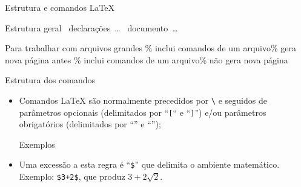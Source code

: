 \begin{frame}{Estrutura e comandos \LaTeX}
	\begin{Codigo}{Estrutura geral}
		\n
			~declarações~\dots\n
		\n
			~documento~\dots\n
	\end{Codigo}

\medskip

	\begin{Codigo}{Para trabalhar com arquivos grandes}
			\% inclui comandos de um arquivo\n \% gera nova página antes\nn
			\% inclui comandos de um arquivo\n \% não gera nova página
	\end{Codigo}
\end{frame}

\begin{frame}{Estrutura dos comandos}
	\begin{itemize}
		\item Comandos \LaTeX{} são normalmente precedidos por \texttt{\textbackslash} e seguidos de parâmetros opcionais (delimitados por ``\texttt{[}`` e ``\texttt{]}'') e/ou parâmetros obrigatórios (delimitados por ``\texttt{\lb}'' e ``\texttt{\rb}'');
		\pause
		\begin{Codigo}{Exemplos}
			\n
			\n
			\n
			\n
		\end{Codigo}
\bigskip
		\pause
		\item Uma excessão a esta regra é ``\texttt{\$}'' que delimita o ambiente matemático. Exemplo: \texttt{\$3+2\$}, que produz $3+2\sqrt{2}$.
	\end{itemize}
\end{frame}

